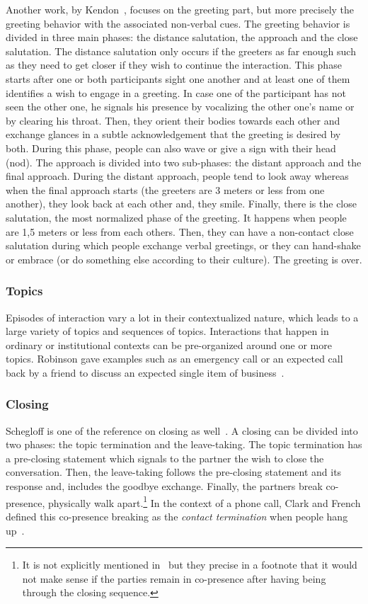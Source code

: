 \documentclass[a4paper,11pt,twoside]{StyleThese}
\begin{document}
Another work, by Kendon~\cite{kendon_1990_conducting}, focuses on the greeting part, but more precisely the greeting behavior with the associated non-verbal cues. The greeting behavior is divided in three main phases: the distance salutation, the approach and the close salutation. 
The distance salutation only occurs if the greeters as far enough such as they need to get closer if they wish to continue the interaction. This phase starts after one or both participants sight one another and at least one of them identifies a wish to engage in a greeting. In case one of the participant has not seen the other one, he signals his presence by vocalizing the other one’s name or by clearing his throat. Then, they orient their bodies towards each other and exchange glances in a subtle acknowledgement that the greeting is desired by both. During this phase, people can also wave or give a sign with their head (\eg nod).
The approach is divided into two sub-phases: the distant approach and the final approach. During the distant approach, people tend to look away whereas when the final approach starts (the greeters are 3 meters or less from one another), they look back at each other and, they smile.
Finally, there is the close salutation, the most normalized phase of the greeting. It happens when people are 1,5 meters or less from each others. Then, they can have a non-contact close salutation during which people exchange verbal greetings, or they can hand-shake or embrace (or do something else according to their culture). The greeting is over.

\subsubsection{Topics}
Episodes of interaction vary a lot in their contextualized nature, which leads to a large variety of topics and sequences of topics. Interactions that happen in ordinary or institutional contexts can be pre-organized around one or more topics. Robinson gave examples such as an emergency call or an expected call back by a friend to discuss an expected single item of business~\cite{robinson_overall_2012}.

\subsubsection{Closing}
Schegloff is one of the reference on closing as well~\cite{schegloff_1973_opening}. A closing can be divided into two phases: the topic termination and the leave-taking.
The topic termination has a pre-closing statement which signals to the partner the wish to close the conversation. Then, the leave-taking follows the pre-closing statement and its response and, includes the goodbye exchange. Finally, the partners break co-presence, \ie physically walk apart.\footnote{It is not explicitly mentioned in~\cite{schegloff_1973_opening}  but they precise in a footnote that it would not make sense if the parties remain in co-presence after having being through the closing sequence.} In the context of a phone call, Clark and French defined this co-presence breaking as the \emph{contact termination} when people hang up~\cite{clark_1981_telephone}.
\end{document}
